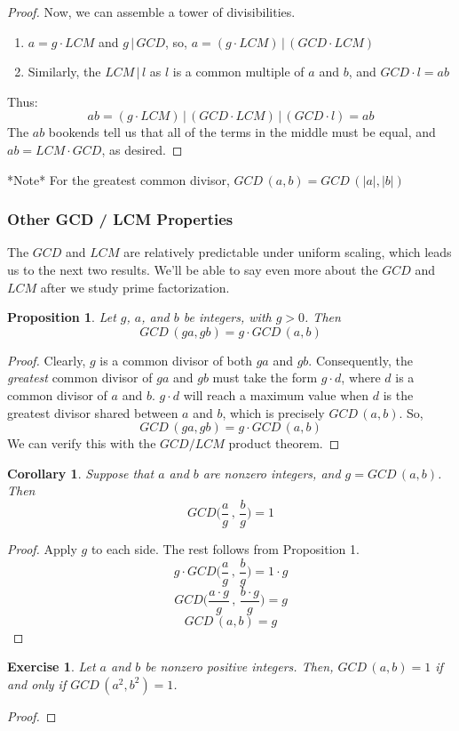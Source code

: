 \documentclass{article}
\newtheorem{corollary}{Corollary}
\newtheorem*{exe}{Exercise}
\newtheorem{prop}{Proposition}
\newcommand{\divv}{\,|\,}
\newcommand{\GCD}[2]{GCD\,(#1, #2)}
\begin{document}
\begin{mdframed}
\begin{proof}
Now, we can assemble a tower of divisibilities.
\begin{enumerate}[] 
\item $a = g \cdot LCM$ and $g\divv GCD$, so, $a = (g \cdot LCM) \divv (GCD \cdot LCM)$  
\item Similarly, the $LCM\divv l$ as $l$ is a common multiple of $a$ and $b$, and $GCD\cdot l = ab$
\end{enumerate}
Thus: 
\[ab = (g \cdot LCM) \divv (GCD \cdot LCM) \divv (GCD \cdot l) = ab\]
The $ab$ bookends tell us that all of the terms in the middle must be equal, and  $ab = LCM \cdot GCD$, as desired. 
\end{proof} 
*Note* For the greatest common divisor, $\GCD{a}{b} = \GCD{|a|}{|b|}$
\end{mdframed}  

\subsubsection*{Other GCD / LCM Properties} 
The $GCD$ and $LCM$ are relatively predictable under uniform scaling, which leads us to the next two results. We’ll be able to say even more about the $GCD$ and $LCM$ after we study prime factorization.

\begin{mdframed} 
\begin{prop} Let $g$, $a$, and $b$ be integers, with $g > 0$. Then
\[\GCD{ga}{gb} = g\cdot\GCD{a}{b}\]
\end{prop}
\begin{proof} Clearly, $g$ is a common divisor of both $ga$ and $gb$. Consequently, the \textit{greatest} common divisor of $ga$ and $gb$ must take the form $g\cdot d$, where $d$ is a common divisor of $a$ and $b$. $g\cdot d$ will reach a maximum value when $d$ is the greatest divisor shared between $a$ and $b$, which is precisely $\GCD{a}{b}$. So, 
\[\GCD{ga}{gb} = g\cdot\GCD{a}{b}\]
We can verify this with the $GCD/LCM$ product theorem.  
\end{proof} 
\end{mdframed} 

\begin{mdframed} 
\begin{corollary} 
Suppose that $a$ and $b$ are nonzero integers, and $g = \GCD{a}{b}$. Then 
\[GCD \bigg(\frac{a}{g}\,, \,\frac{b}{g}\bigg) = 1\]
\end{corollary} 
\begin{proof}
Apply $g$ to each side. The rest follows from Proposition 1. 
\[g\cdot GCD \bigg(\frac{a}{g}\,, \,\frac{b}{g}\bigg) = 1\cdot g \]
\[GCD \bigg(\frac{a\cdot g}{g}\,, \,\frac{b\cdot g}{g}\bigg) = g\]
\[\GCD{a}{b} = g \]  
\end{proof} 
\end{mdframed} 

\begin{mdframed} 
\begin{exe} Let $a$ and $b$ be nonzero positive integers. Then, $\GCD{a}{b} = 1$ if and only if $\GCD{a^2}{b^2} = 1$.
\end{exe}
\begin{proof} 
\end{proof}   
\end{mdframed} 
\end{document}
